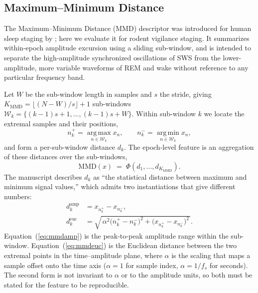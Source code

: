 \subsection{Maximum--Minimum Distance}
\label{subsec:mmd}

The Maximum--Minimum Distance (MMD) descriptor was introduced for
human sleep staging by \citet{e18090272}; here we evaluate it for rodent
vigilance staging. It summarizes within-epoch amplitude excursion using a
sliding sub-window, and is intended to separate the high-amplitude
synchronized oscillations of SWS from the lower-amplitude, more variable
waveforms of REM and wake without reference to any particular frequency
band.

Let $W$ be the sub-window length in samples and $s$ the stride, giving
$K_{\mathrm{MMD}} = \lfloor (N - W)/s \rfloor + 1$ sub-windows
$\mathcal{W}_k = \{(k-1)s + 1, \dots, (k-1)s + W\}$. Within sub-window $k$
we locate the extremal samples and their positions,
%
\begin{equation}
\label{eq:mmdargs}
n_k^{+} = \operatorname*{arg\,max}_{n \in \mathcal{W}_k} x_n,
\qquad
n_k^{-} = \operatorname*{arg\,min}_{n \in \mathcal{W}_k} x_n,
\end{equation}
%
and form a per-sub-window distance $d_k$. The epoch-level feature is an
aggregation of these distances over the sub-windows,
%
\begin{equation}
\label{eq:mmd}
\mathrm{MMD}(x) \;=\; \Phi\!\left( d_1, \dots, d_{K_{\mathrm{MMD}}} \right).
\end{equation}
%
The manuscript describes $d_k$ as ``the statistical distance between
maximum and minimum signal values,'' which admits two instantiations that
give different numbers:
%
\begin{align}
d_k^{\mathrm{amp}} &= x_{n_k^{+}} - x_{n_k^{-}},
\label{eq:mmdamp}\\
d_k^{\mathrm{euc}} &= \sqrt{\,\alpha^{2}\big(n_k^{+} - n_k^{-}\big)^{2}
                     + \big(x_{n_k^{+}} - x_{n_k^{-}}\big)^{2}\,}.
\label{eq:mmdeuc}
\end{align}
%
Equation~(\ref{eq:mmdamp}) is the peak-to-peak amplitude range within the
sub-window. Equation~(\ref{eq:mmdeuc}) is the Euclidean distance between
the two extremal points in the time--amplitude plane, where $\alpha$ is the
scaling that maps a sample offset onto the time axis ($\alpha = 1$ for
sample index, $\alpha = 1/f_s$ for seconds). The second form is not
invariant to $\alpha$ or to the amplitude units, so both must be stated for
the feature to be reproducible.


